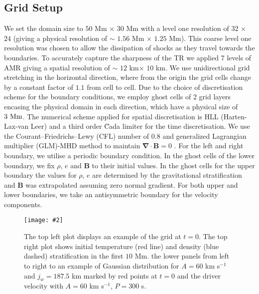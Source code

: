 \documentclass[12pt]{ociamthesis}
\newcommand{\bs}[1]{\boldsymbol{#1}}
\newcommand{\mfig}[4]{
  \begin{figure}
  \begin{center}
  \texttt{[image: \#2]}
  \caption{#3}
  \label{#4}
  \end{center}
  \end{figure}}
\begin{document}
\subsection{Grid Setup}
\label{sec:Grid_Setup}
We set the domain size to $50$ Mm $\times$ $30$ Mm with a level one resolution of $32$ $\times$ $24$ (giving a physical resolution of $\sim$ $1.56$ Mm $\times$ $1.25$ Mm). This coarse level one resolution was chosen to allow the dissipation of shocks as they travel towards the boundaries. To accurately capture the sharpness of the TR we applied 7 levels of AMR giving a spatial resolution of $\sim$ $12$ km$\times$ $10$ km. We use unidirectional grid stretching in the horizontal direction, where from the origin the grid cells change by a constant factor of $1.1$ from cell to cell. Due to the choice of discretisation scheme for the boundary conditions, we employ ghost cells of 2 grid layers encasing the physical domain in each direction, which have a physical size of $3~\rm{Mm}$. The numerical scheme applied for spatial discretisation is HLL (Harten-Lax-van Leer) \cite{hll_1983} and a third order \u{C}ada limiter \citep{CADA20094118} for the time discretisation. We use the Courant–Friedrichs–Lewy (CFL) number of $0.8$ and generalized Lagrangian multiplier (GLM)-MHD method to maintain $\bs{\nabla} \cdot \bs{B}=0$ \citep{DEDNER2002645}. For the left and right boundary, we utilise a periodic boundary condition. In the ghost cells of the lower boundary, we fix $\rho$, $e$ and $\bs{B}$ to their initial values. In the ghost cells for the upper boundary the values for $\rho$, $e$ are determined by the gravitational stratification and $\bs{B}$ was extrapolated assuming zero normal gradient. For both upper and lower boundaries, we take an antisymmetric boundary for the velocity components.
\mfig{1}{figures/numerical_Setup_lowres.png}{The top left plot displays an example of the grid at $t=0$. The top right plot shows initial temperature (red line) and density (blue dashed) stratification in the first $10$ Mm. the lower panels from left to right to an example of Gaussian distribution for $A=60$ km s$^{-1}$ and $j_w=187.5$ km marked by red points at $t=0$ and the driver velocity with $A=60$ km s$^{-1}$, $P=300$ s.}{atoms_profile}
\end{document}
